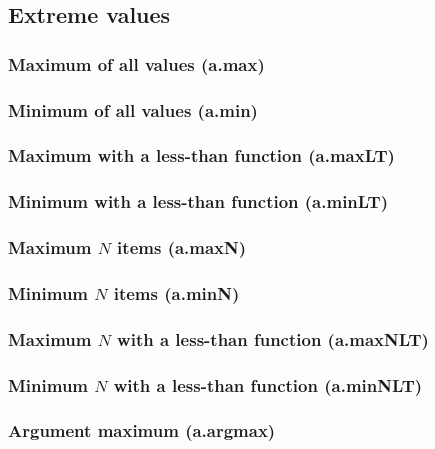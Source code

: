 \documentclass{article}
\theoremstyle{definition}
\begin{document}
\subsection{Extreme values}

\subsubsection{Maximum of all values (a.max)}

\subsubsection{Minimum of all values (a.min)}

\subsubsection{Maximum with a less-than function (a.maxLT)}

\subsubsection{Minimum with a less-than function (a.minLT)}

\subsubsection{Maximum $N$ items (a.maxN)}

\subsubsection{Minimum $N$ items (a.minN)}

\subsubsection{Maximum $N$ with a less-than function (a.maxNLT)}

\subsubsection{Minimum $N$ with a less-than function (a.minNLT)}

\subsubsection{Argument maximum (a.argmax)}
\end{document}
